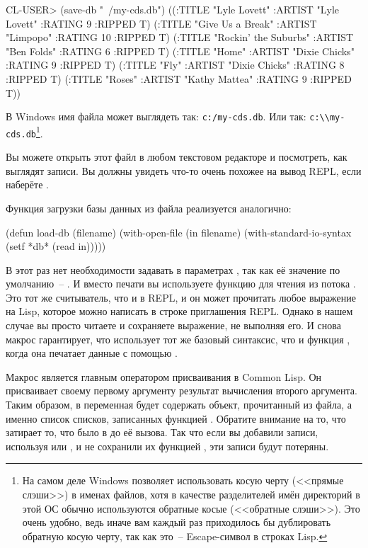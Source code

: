 \begin{myverb}
  CL-USER> (save-db "~/my-cds.db")
  ((:TITLE "Lyle Lovett" :ARTIST "Lyle Lovett" :RATING 9 :RIPPED T)
   (:TITLE "Give Us a Break" :ARTIST "Limpopo" :RATING 10 :RIPPED T)
   (:TITLE "Rockin' the Suburbs" :ARTIST "Ben Folds" :RATING 6 :RIPPED T)
   (:TITLE "Home" :ARTIST "Dixie Chicks" :RATING 9 :RIPPED T)
   (:TITLE "Fly" :ARTIST "Dixie Chicks" :RATING 8 :RIPPED T)
   (:TITLE "Roses" :ARTIST "Kathy Mattea" :RATING 9 :RIPPED T))
\end{myverb}

В Windows имя файла может выглядеть так: \lstinline!c:/my-cds.db!. Или так:
\lstinline!c:\\my-cds.db!\footnote{На самом деле Windows позволяет использовать косую
  черту (<<прямые слэши>>) в именах файлов, хотя в качестве разделителей имён директорий в
  этой ОС обычно используются обратные косые (<<обратные слэши>>). Это очень удобно, ведь
  иначе вам каждый раз приходилось бы дублировать обратную косую черту, так как это~--
  Escape-символ в строках Lisp.}.

Вы можете открыть этот файл в любом текстовом редакторе и посмотреть, как выглядят
записи. Вы должны увидеть что-то очень похожее на вывод REPL, если наберёте .

Функция загрузки базы данных из файла реализуется аналогично:

\begin{myverb}
(defun load-db (filename)
  (with-open-file (in filename)
    (with-standard-io-syntax
      (setf *db* (read in)))))
\end{myverb}

В этот раз нет необходимости задавать  в параметрах
, так как её значение по умолчанию~-- . И вместо печати
вы используете функцию  для чтения из потока . Это тот же
считыватель, что и в REPL, и он может прочитать любое выражение на Lisp, которое можно
написать в строке приглашения REPL. Однако в нашем случае вы просто читаете и сохраняете
выражение, не выполняя его. И снова макрос  гарантирует,
что  использует тот же базовый синтаксис, что и функция , когда
она печатает данные с помощью .

Макрос  является главным оператором присваивания в Common Lisp. Он
присваивает своему первому аргументу результат вычисления второго аргумента. Таким образом,
в  переменная  будет содержать объект, прочитанный из файла, а
именно список списков, записанных функцией . Обратите внимание на то, что
 затирает то, что было в  до её вызова. Так что если вы добавили
записи, используя  или , и не сохранили их функцией
, эти записи будут потеряны.

